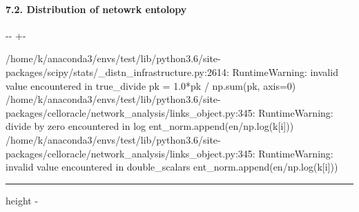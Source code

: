 \documentclass[letterpaper,10pt,english]{sphinxmanual}
\newlength\nbsphinxcodecellspacing
\begin{document}
\paragraph{7.2. Distribution of netowrk entolopy}
\label{\detokenize{notebooks/04_Network_analysis/Network_analysis_with_with_Paul_etal_2015_data:7.2.-Distribution-of-netowrk-entolopy}}
{
\begin{sphinxVerbatim}[commandchars=\\\{\}]
\llap{\color{nbsphinxin}[62]:\,\hspace{\fboxrule}\hspace{\fboxsep}} 


\end{sphinxVerbatim}
}

{

\kern-\sphinxverbatimsmallskipamount\kern-\baselineskip
\kern+\FrameHeightAdjust\kern-\fboxrule
\vspace{\nbsphinxcodecellspacing}

\begin{sphinxVerbatim}[commandchars=\\\{\}]
/home/k/anaconda3/envs/test/lib/python3.6/site-packages/scipy/stats/\_distn\_infrastructure.py:2614: RuntimeWarning: invalid value encountered in true\_divide
  pk = 1.0*pk / np.sum(pk, axis=0)
/home/k/anaconda3/envs/test/lib/python3.6/site-packages/celloracle/network\_analysis/links\_object.py:345: RuntimeWarning: divide by zero encountered in log
  ent\_norm.append(en/np.log(k[i]))
/home/k/anaconda3/envs/test/lib/python3.6/site-packages/celloracle/network\_analysis/links\_object.py:345: RuntimeWarning: invalid value encountered in double\_scalars
  ent\_norm.append(en/np.log(k[i]))
\end{sphinxVerbatim}
}

\hrule height -\fboxrule\relax
\vspace{\nbsphinxcodecellspacing}
\end{document}
